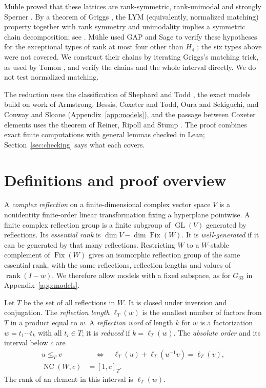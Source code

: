 \documentclass[11pt]{article}
\theoremstyle{definition}
\newcommand{\NC}{\operatorname{NC}}
\newcommand{\rank}{\operatorname{rank}}
\newcommand{\Fix}{\operatorname{Fix}}
\begin{document}
M\"uhle proved that these lattices are rank-symmetric, rank-unimodal
and strongly Sperner \cite[Theorem~1.4]{Muhle}. By a theorem of Griggs
\cite{Griggs}, the LYM (equivalently, normalized matching) property
together with rank symmetry and unimodality implies a symmetric chain
decomposition; see \cite[Theorem~4.1]{Muhle}. M\"uhle used GAP and Sage
to verify these hypotheses for the exceptional types of rank at most
four other than $H_4$ \cite[Proposition~4.2]{Muhle}; the six types above
were not covered. We construct their chains by iterating Griggs's
matching trick, as used by Tomon \cite{Griggs}\cite[\mbox{\S\S3--4}]{Tomon},
and verify the chains and the whole interval directly. We do not test
normalized matching.

The reduction uses the classification of Shephard and Todd \cite{ST},
the exact models build on work of Armstrong, Bessis, Coxeter and Todd,
Oura and Sekiguchi, and Conway and Sloane (Appendix~\ref{app:models}),
and the passage between Coxeter elements uses the theorem of Reiner,
Ripoll and Stump \cite{RRS}. The proof combines exact finite
computations with general lemmas checked in Lean;
Section~\ref{sec:checking} says what each covers.

\section{Definitions and proof overview}\label{sec:overview}
A \emph{complex reflection} on a finite-dimensional complex vector
space $V$ is a nonidentity finite-order linear transformation fixing
a hyperplane pointwise. A finite complex reflection group is a finite subgroup of $\operatorname{GL}(V)$
generated by reflections. Its \emph{essential rank} is
$\dim V-\dim\Fix(W)$. It is \emph{well-generated} if it can be generated
by that many reflections. Restricting $W$ to a $W$-stable complement
of $\Fix(W)$ gives an isomorphic reflection group of the same essential
rank, with the same reflections, reflection lengths and values of
$\rank(I-w)$. We therefore allow models with a fixed subspace, as for
$G_{33}$ in Appendix~\ref{app:models}.

Let $T$ be the set of all reflections in $W$. It is closed under
inversion and conjugation. The \emph{reflection length} $\ell_T(w)$ is
the smallest number of factors from $T$ in a product equal to $w$.
A \emph{reflection word} of length $k$ for $w$ is a factorization
$w=t_1\cdots t_k$ with all $t_i\in T$; it is \emph{reduced} if
$k=\ell_T(w)$.
The \emph{absolute order} and its interval below $c$ are
\begin{align*}
 u\leq_T v&\quad\Longleftrightarrow\quad
       \ell_T(u)+\ell_T(u^{-1}v)=\ell_T(v),\\
 \NC(W,c)&=[1,c]_T.
\end{align*}
The rank of an element in this interval is $\ell_T(w)$.
\end{document}
